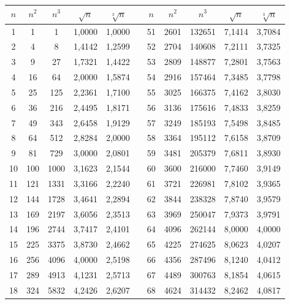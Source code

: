 \documentclass[a4paper,oneside]{book}%
\author{claudio duchi}
\begin{document}
	\begin{longtable}{S@{\hspace{0.2cm}}S@{\hspace{0.2cm}}S@{\hspace{0.2cm}}S@{\hspace{0.2cm}}S@{\hspace{0.2cm}}S@{\hspace{0.2cm}}S@{\hspace{0.2cm}}S@{\hspace{0.2cm}}S@{\hspace{0.2cm}}S@{\hspace{0.2cm}}S} 
		\toprule
	{$n$} &  {$n^2$} & {$n^3$}&{$\sqrt{n}$}&{$\sqrt[3]{n}$}&{ }&{$n$} &  {$n^2$} & {$n^3$}&{$\sqrt{n}$}&{$\sqrt[3]{n}$}  \\
		\midrule \endhead
		\bottomrule \endfoot{}
		1&1&1&1,0000&1,0000&&51&2601&132651&7,1414&3,7084\\
		2&4&8&1,4142&1,2599&&52&2704&140608&7,2111&3,7325\\
		3&9&27&1,7321&1,4422&&53&2809&148877&7,2801&3,7563\\
		4&16&64&2,0000&1,5874&&54&2916&157464&7,3485&3,7798\\
		5&25&125&2,2361&1,7100&&55&3025&166375&7,4162&3,8030\\
		6&36&216&2,4495&1,8171&&56&3136&175616&7,4833&3,8259\\
		7&49&343&2,6458&1,9129&&57&3249&185193&7,5498&3,8485\\
		8&64&512&2,8284&2,0000&&58&3364&195112&7,6158&3,8709\\
		9&81&729&3,0000&2,0801&&59&3481&205379&7,6811&3,8930\\
		10&100&1000&3,1623&2,1544&&60&3600&216000&7,7460&3,9149\\
		11&121&1331&3,3166&2,2240&&61&3721&226981&7,8102&3,9365\\
		12&144&1728&3,4641&2,2894&&62&3844&238328&7,8740&3,9579\\
		13&169&2197&3,6056&2,3513&&63&3969&250047&7,9373&3,9791\\
		14&196&2744&3,7417&2,4101&&64&4096&262144&8,0000&4,0000\\
		15&225&3375&3,8730&2,4662&&65&4225&274625&8,0623&4,0207\\
		16&256&4096&4,0000&2,5198&&66&4356&287496&8,1240&4,0412\\
		17&289&4913&4,1231&2,5713&&67&4489&300763&8,1854&4,0615\\
		18&324&5832&4,2426&2,6207&&68&4624&314432&8,2462&4,0817\\

\end{longtable}
\end{document}
